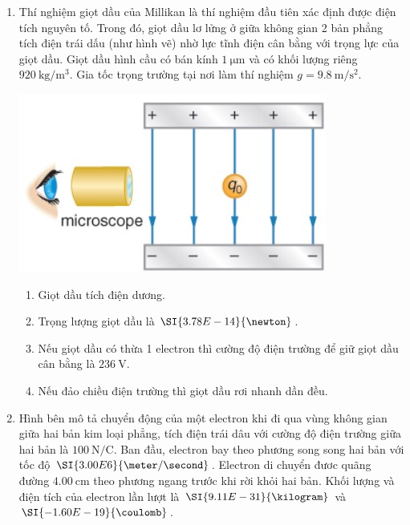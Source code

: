 \begin{enumerate}[label=\bfseries Câu \arabic*:]
	\item Thí nghiệm giọt dầu của Millikan là thí nghiệm đầu tiên xác định được điện tích nguyên tố. Trong đó, giọt dầu lơ lửng ở giữa không gian 2 bản phẳng tích điện trái dấu (như hình vẽ) nhờ lực tĩnh điện cân bằng với trọng lực của giọt dầu. Giọt dầu hình cầu có bán kính $\SI{1}{\micro\meter}$ và có khối lượng riêng $\SI{920}{\kilogram/\meter^3}$. Gia tốc trọng trường tại nơi làm thí nghiệm $g=\SI{9.8}{\meter/\second^2}$.
	\begin{center}
		\includegraphics[width=0.4\linewidth]{../figs/PH11-MidSem2-02-6}
	\end{center}
	\begin{enumerate}[label=\bfseries \alph*)]
		\item Giọt dầu tích điện dương.
		\item Trọng lượng giọt dầu là $\SI{3.78E-14}{\newton}$.
		\item Nếu giọt dầu có thừa 1 electron thì cường độ điện trường để giữ giọt dầu cân bằng là $\SI{236}{\volt}$.
		\item Nếu đảo chiều điện trường thì giọt dầu rơi nhanh dần đều.
	\end{enumerate}
	\item Hình bên mô tả chuyển động của một electron khi đi qua vùng không gian giữa hai bản kim loại phẳng, tích điện trái dâu với cường độ điện trường giữa hai bản là $\SI{100}{\newton/\coulomb}$. Ban đầu, electron bay theo phương song song hai bản với tốc độ $\SI{3.00E6}{\meter/\second}$. Electron di chuyển đươc quãng đường $\SI{4.00}{\centi\meter}$ theo phương ngang trước khi rời khỏi hai bản. Khối lượng và điện tích của electron lần lượt là $\SI{9.11E-31}{\kilogram}$ và $\SI{-1.60E-19}{\coulomb}$.

\end{enumerate}
